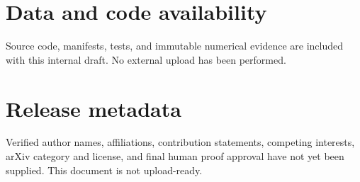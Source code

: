 \documentclass[a4paper,twocolumn,11pt,unpublished]{quantumarticle}
\begin{document}
\section*{Data and code availability}

Source code, manifests, tests, and immutable numerical evidence are included
with this internal draft.  No external upload has been performed.

\section*{Release metadata}

Verified author names, affiliations, contribution statements, competing
interests, arXiv category and license, and final human proof approval have not
yet been supplied.  This document is not upload-ready.




\clearpage
\appendix

\end{document}
